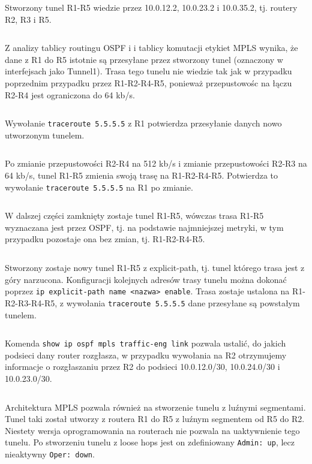 \documentclass[a4paper,12pt,notitlepage]{article}
\begin{document}
Stworzony tunel R1-R5 wiedzie przez 10.0.12.2, 10.0.23.2 i 10.0.35.2, tj. routery R2, R3 i R5.
\inputminted[label=MPLS tunel R1-R5, firstline=309, lastline=357]{text}{R/R1.txt}

Z analizy tablicy routingu OSPF i i tablicy komutacji etykiet MPLS wynika, że dane z R1 do R5 istotnie są przesyłane przez stworzony tunel (oznaczony w interfejsach jako Tunnel1). Trasa tego tunelu nie wiedzie tak jak w przypadku poprzednim przypadku przez R1-R2-R4-R5, ponieważ przepustowośc na łączu R2-R4 jest ograniczona do 64 kb/s. 
\inputminted[label=show ip route i show mpls forwarding-table dla R1, firstline=362, lastline=406]{text}{R/R1.txt}

Wywołanie \texttt{traceroute 5.5.5.5} z R1 potwierdza przesyłanie danych nowo utworzonym tunelem.
\inputminted[label=traceroute 5.5.5.5 z R1 po utworzeniu tunelu, firstline=407, lastline=414]{text}{R/R1.txt}

Po zmianie przepustowości R2-R4 na 512 kb/s i zmianie przepustowości R2-R3 na 64 kb/s, tunel R1-R5 zmienia swoją trasę na R1-R2-R4-R5. Potwierdza to wywołanie \texttt{traceroute 5.5.5.5} na R1 po zmianie.
\inputminted[label=traceroute 5.5.5.5 z R1 po zmianie przepustowości, firstline=425, lastline=432]{text}{R/R1.txt}

W dalszej części zamknięty zostaje tunel R1-R5, wówczas trasa R1-R5 wyznaczana jest przez OSPF, tj. na podstawie najmniejszej metryki, w tym przypadku pozostaje ona bez zmian, tj. R1-R2-R4-R5.
\inputminted[label=Zamknięcie tunelu R1-R5, firstline=439, lastline=472]{text}{R/R1.txt}

Stworzony zostaje nowy tunel R1-R5 z explicit-path, tj. tunel którego trasa jest z góry narzucona. Konfiguracji kolejnych adresów trasy tunelu można dokonać poprzez \texttt{ip explicit-path name <nazwa> enable}. Trasa zostaje ustalona na R1-R2-R3-R4-R5, z wywołania \texttt{traceroute 5.5.5.5} dane przesyłane są powstałym tunelem.
\inputminted[label=Tunel R1-R5 z explicit-path R1-R2-R3-R4, firstline=521, lastline=538]{text}{R/R1.txt}

Komenda \texttt{show ip ospf mpls traffic-eng link} pozwala ustalić, do jakich podsieci dany router rozgłasza, w przypadku wywołania na R2 otrzymujemy informacje o rozgłaszaniu przez R2 do podsieci 10.0.12.0/30, 10.0.24.0/30 i 10.0.23.0/30.
\inputminted[label=show ip ospf mpls traffic-eng link na R2, firstline=456, lastline=508]{text}{R/R2.txt}

Architektura MPLS pozwala również na stworzenie tunelu z luźnymi segmentami. Tunel taki został utworzy z routera R1 do R5 z luźnym segmentem od R5 do R2. Niestety wersja oprogramowania na routerach nie pozwala na uaktywnienie tego tunelu. Po stworzeniu tunelu z loose hops jest on zdefiniowany \texttt{Admin: up}, lecz nieaktywny \texttt{Oper: down}.
\inputminted[label=Tunel R5-R1 z loose hops, firstline=1266, lastline=1295]{text}{R/R5.txt}
\end{document}

